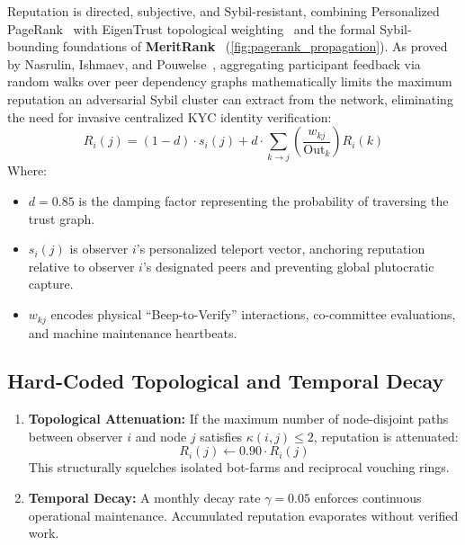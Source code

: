 \documentclass[a4paper,11pt,twoside,parskip=half-,headings=small]{scrartcl}
\begin{document}
Reputation is directed, subjective, and Sybil-resistant, combining Personalized PageRank~\cite{page1999pagerank} with EigenTrust topological weighting~\cite{kamvar2003eigentrust} and the formal Sybil-bounding foundations of \textbf{MeritRank}~\cite{nasrulin2022meritrank} (\cref{fig:pagerank_propagation}). As proved by Nasrulin, Ishmaev, and Pouwelse~\cite{nasrulin2022meritrank}, aggregating participant feedback via random walks over peer dependency graphs mathematically limits the maximum reputation an adversarial Sybil cluster can extract from the network, eliminating the need for invasive centralized KYC identity verification:
\begin{equation}
R_i(j) = (1 - d) \cdot s_i(j) + d \cdot \sum_{k \to j} \left( \frac{w_{kj}}{\text{Out}_k} \right) R_i(k)
  \label{eq:pagerank}
\end{equation}
Where:
\begin{itemize}
  \item $d = 0.85$ is the damping factor representing the probability of traversing the trust graph.
  \item $s_i(j)$ is observer $i$'s personalized teleport vector, anchoring reputation
relative to observer $i$'s designated peers and preventing global plutocratic capture.
  \item $w_{kj}$ encodes physical ``Beep-to-Verify'' interactions, co-committee evaluations,
and machine maintenance heartbeats.
\end{itemize}

\subsection{Hard-Coded Topological and Temporal Decay}

\begin{enumerate}
  \item \textbf{Topological Attenuation:} If the maximum number of node-disjoint paths
between observer $i$ and node $j$ satisfies $\kappa(i, j) \le 2$, reputation is attenuated:
\begin{equation}
R_i(j) \leftarrow 0.90 \cdot R_i(j)
\end{equation}
This structurally squelches isolated bot-farms and reciprocal vouching rings.
  \item \textbf{Temporal Decay:} A monthly decay rate $\gamma = 0.05$ enforces continuous
operational maintenance. Accumulated reputation evaporates without verified work.
\end{enumerate}
\end{document}
